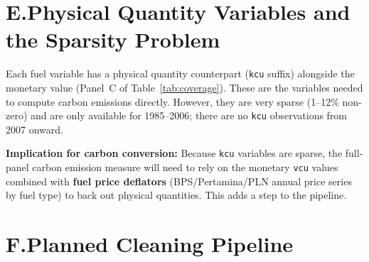 \documentclass[11pt, a4paper]{article}
\begin{document}
\section{E.\;Physical Quantity Variables and the Sparsity Problem}
\label{sec:sparse}

Each fuel variable has a physical quantity counterpart (\texttt{kcu} suffix) alongside the
monetary value (Panel~C of Table~\ref{tab:coverage}). These are the variables needed to
compute carbon emissions directly. However, they are very sparse (1--12\% non-zero)
and are only available for 1985--2006; there are no \texttt{kcu} observations from
2007 onward.

\noindent\textbf{Implication for carbon conversion:} Because \texttt{kcu} variables are sparse,
the full-panel carbon emission measure will need to rely on the monetary \texttt{vcu} values
combined with \textbf{fuel price deflators} (BPS/Pertamina/PLN annual price series by fuel
type) to back out physical quantities. This adds a step to the pipeline.


\section{F.\;Planned Cleaning Pipeline}
\end{document}
